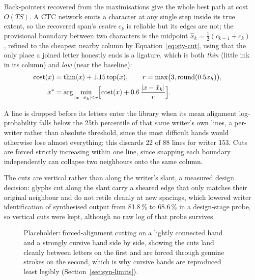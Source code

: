 Back-pointers recovered from the maximisations give the whole best path at cost $O(TS)$. A CTC network emits a character at any single step inside its true extent, so the recovered span's \emph{centre} $c_k$ is reliable but its edges are not; the provisional boundary between two characters is the midpoint $\hat x_k=\tfrac12(c_{k-1}+c_k)$, refined to the cheapest nearby column by Equation~\ref{eq:sty-cut}, using that the only place a joined letter honestly ends is a ligature, which is both \emph{thin} (little ink in its column) and \emph{low} (near the baseline):
\begin{equation}
\begin{aligned}
\mathrm{cost}(x)&=\mathrm{thin}(x)+1.15\,\mathrm{top}(x),\qquad r=\max\bigl(3,\mathrm{round}(0.5x_h)\bigr),\\
x^*&=\arg\min_{|x-\hat x_k|\le r}\Bigl[\mathrm{cost}(x)+0.6\,\frac{|x-\hat x_k|}{r}\Bigr].
\end{aligned}
\label{eq:sty-cut}
\end{equation}

A line is dropped before its letters enter the library when its mean alignment log-probability falls below the 25th percentile of that same writer's own lines, a per-writer rather than absolute threshold, since the most difficult hands would otherwise lose almost everything; this discards 22 of 88 lines for writer 153. Cuts are forced strictly increasing within one line, since snapping each boundary independently can collapse two neighbours onto the same column.

The cuts are vertical rather than along the writer's slant, a measured design decision: glyphs cut along the slant carry a sheared edge that only matches their original neighbour and do not retile cleanly at new spacings, which lowered writer identification of synthesised output from 81.8\,\% to 68.6\,\% in a design-stage probe, so vertical cuts were kept, although no raw log of that probe survives.

\begin{figure}[htb]
\centering
{}
\captionsetup{singlelinecheck=false,justification=justified}
\caption{Placeholder: forced-alignment cutting on a lightly connected hand and a strongly cursive hand side by side, showing the cuts land cleanly between letters on the first and are forced through genuine strokes on the second, which is why cursive hands are reproduced least legibly (Section~\ref{sec:syn-limits}).}
\label{fig:sty-cuts-fig}
\end{figure}


